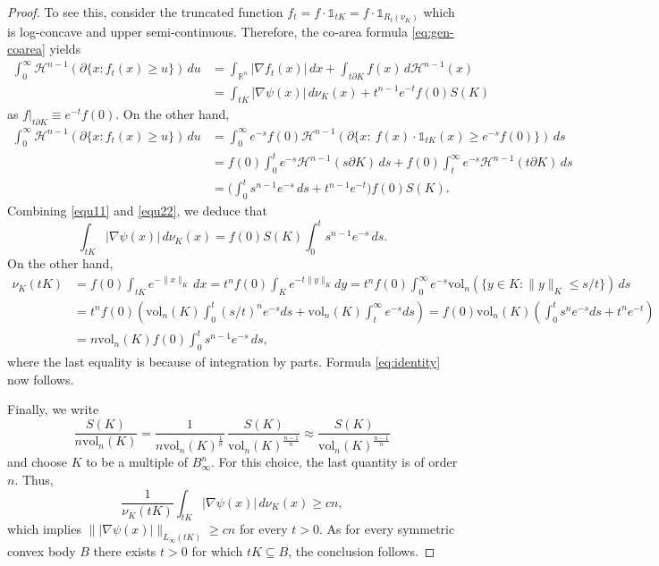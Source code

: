 \documentclass[11pt,leqno]{article}
\theoremstyle{definition}
\theoremstyle{remark}
\numberwithin{equation}{section}
\newcommand{\ls}{\leqslant}
\newcommand{\gr}{\geqslant}
\newcommand{\1}{\textbf{1}}
\newcommand{\R}{\mathbb{R}}
\newcommand{\vol}{\mathrm{vol}}
\begin{document}
\begin{proof}
To see this, consider the truncated function $f_t = f \cdot \mathds{1}_{tK} = f\cdot  \mathds{1}_{R_t(\nu_K)}$ which is log-concave and upper semi-continuous. Therefore, the co-area formula \eqref{eq:gen-coarea} yields
\begin{align} \label{equ11}
\int_0^\infty \mathcal{H}^{n-1} (\partial\{x: f_t(x)\gr u\})\, du & = \int_{\R^n} |\nabla f_t(x)| \, d x + \int_{t\partial K} f(x)\, d\mathcal{H}^{n-1}(x)\\ 
\nonumber & = \int_{tK} |\nabla \psi(x)|\, d\nu_K(x) + t^{n-1} e^{-t}f(0)S(K)
\end{align}
as $f|_{t\partial K} \equiv e^{-t}f(0)$. On the other hand,
\begin{align} \label{equ22}
\int_0^\infty \mathcal{H}^{n-1}  (\partial\{x: f_t(x)\gr u\})\, du & = \int_0^\infty e^{-s} f(0) \mathcal{H}^{n-1}(\partial\{x: \ f(x)  \cdot \mathds{1}_{tK}(x) \gr e^{-s} f(0)\})\, ds\\ 
\nonumber & = f(0) \int_0^t e^{-s} \mathcal{H}^{n-1}(s\partial K)\, ds + f(0)\int_t^\infty e^{-s} \mathcal{H}^{n-1}(t\partial K) \, ds\\ 
\nonumber & = \bigg(\int_0^t s^{n-1} e^{-s}\, ds + t^{n-1} e^{-t}\bigg) f(0)S(K).
\end{align}
Combining \eqref{equ11} and \eqref{equ22}, we deduce that
\begin{equation}
\int_{tK} |\nabla \psi(x)|\, d\nu_K(x) = f(0) S(K) \int_0^t s^{n-1} e^{-s} \, ds.
\end{equation}
On the other hand,
\begin{align*}
\nu_K(tK) & = f(0) \int_{tK} e^{-\|x\|_K}\, dx =t^n f(0)\int_Ke^{-t\|y\|_K}dy
=t^n f(0) \int_0^{\infty}e^{-s}\vol_n(\{y\in K:\|y\|_K\ls s/t\})\,ds\\
&=t^n f(0)\left(\vol_n(K)\int_0^t(s/t)^ne^{-s}ds+\vol_n(K)\int_t^{\infty}e^{-s}ds\right) =f(0) \vol_n(K) \left(\int_0^ts^ne^{-s}ds+t^ne^{-t}\right)\\ 
& = n \vol_n(K) f(0) \int_0^t s^{n-1} e^{-s}\, ds,
\end{align*}
where the last equality is because of integration by parts. Formula \eqref{eq:identity} now follows.

Finally, we write 
$$\frac{S(K)}{n\vol_n(K)}=\frac{1}{n\vol_n(K)^{\frac{1}{n}}}\,\frac{S(K)}{\vol_n(K)^{\frac{n-1}{n}}}\approx \frac{S(K)}{\vol_n(K)^{\frac{n-1}{n}}}$$
and choose $K$ to be a multiple of $B_{\infty}^n$. For this choice, the last quantity is of order $n$. Thus,
$$\frac{1}{\nu_K(tK)}\int_{tK}|\nabla \psi(x)|\,d\nu_K(x)\gr cn,$$ which implies $\||\nabla\psi(x)|\|_{L_\infty(tK)}\gr cn$ for every $t>0$. As for every symmetric convex body $B$ there exists $t>0$ for which $tK\subseteq B$, the conclusion follows.
\end{proof}
\end{document}
